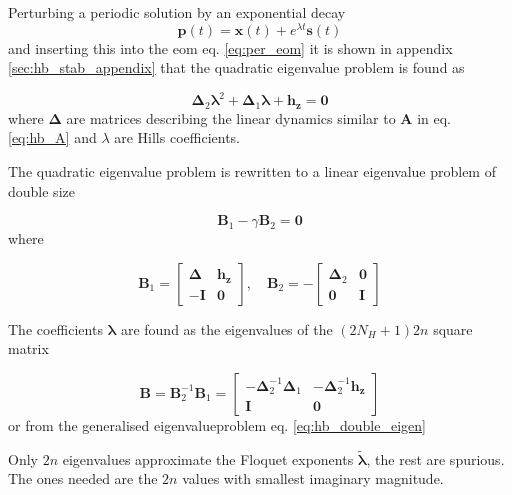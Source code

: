 Perturbing a periodic solution by an exponential decay
\begin{equation}
  \label{eq:hb_pert}
  \bm p(t) = \bm x(t) + e^{\lambda t}\bm s(t)
\end{equation}
and inserting this into the eom eq. \eqref{eq:per_eom} it is shown in appendix
\ref{sec:hb_stab_appendix} that the quadratic eigenvalue problem is found as

\begin{equation}
  \label{eq:hb_quad_eigen}
  \bm \Delta_2 \bm \lambda^2 + \bm \Delta_1 \bm \lambda + \bm h_{\bm z} = \bm 0
\end{equation}
where $\bm \Delta$ are matrices describing the linear dynamics similar to $\bm
A$ in eq. \eqref{eq:hb_A} and $\lambda$ are Hills coefficients.

The quadratic eigenvalue problem is rewritten to a linear eigenvalue problem of
double size

\begin{equation}
  \label{eq:hb_double_eigen}
  \bm B_1 - \gamma \bm B_2 = \bm 0
\end{equation}
where

\begin{equation}
  \label{eq:hb_stab_B12}
  \bm B_1 =
  \begin{bmatrix}
    \bm \Delta  & \bm h_{\bm z} \\
    -\bm{I}    & \bm 0
  \end{bmatrix}, \quad
  \bm B_2 = -
  \begin{bmatrix}
    \bm \Delta_2   & \bm 0 \\
    \bm 0          & \bm{I}
  \end{bmatrix}
\end{equation}

The coefficients $\bm \lambda$ are found as the eigenvalues of the $(2N_H+1)2n$
square matrix

\begin{equation}
  \label{eq:hb_B}
  \bm B = \bm B^{-1}_2 \bm B_1 =
  \begin{bmatrix}
    -\bm \Delta^{-1}_2 \bm\Delta_1 & -\bm \Delta^{-1}_2 \bm h_{\bm z} \\
    \bm{I}                    & \bm 0
  \end{bmatrix}
\end{equation}
or from the generalised eigenvalueproblem eq. \eqref{eq:hb_double_eigen}

Only $2n$ eigenvalues approximate the Floquet exponents $\tilde{\bm \lambda}$,
the rest are spurious. The ones needed are the $2n$ values with smallest
imaginary magnitude.


